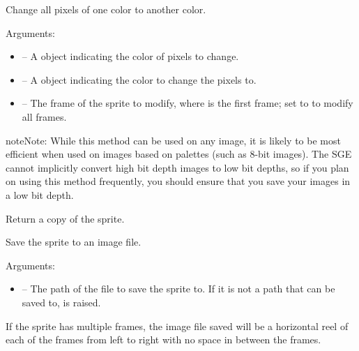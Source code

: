 \documentclass[letterpaper,10pt,english]{sphinxmanual}
\begin{document}
\begin{fulllineitems}
\label{gfx:sge.gfx.Sprite.swap_color}
Change all pixels of one color to another color.

Arguments:
\begin{itemize}
\item {} 
 -- A {\hyperref[gfx:sge.gfx.Color]{\emph{}}} object indicating
the color of pixels to change.

\item {} 
 -- A {\hyperref[gfx:sge.gfx.Color]{\emph{}}} object indicating
the color to change the pixels to.

\item {} 
 -- The frame of the sprite to modify, where  is
the first frame; set to  to modify all frames.

\end{itemize}

\begin{notice}{note}{Note:}
While this method can be used on any image, it is likely to
be most efficient when used on images based on palettes
(such as 8-bit images).  The SGE cannot implicitly convert
high bit depth images to low bit depths, so if you plan on
using this method frequently, you should ensure that you
save your images in a low bit depth.
\end{notice}

\end{fulllineitems}


\begin{fulllineitems}
\label{gfx:sge.gfx.Sprite.copy}
Return a copy of the sprite.

\end{fulllineitems}


\begin{fulllineitems}
\label{gfx:sge.gfx.Sprite.save}
Save the sprite to an image file.

Arguments:
\begin{itemize}
\item {} 
 -- The path of the file to save the sprite to.  If
it is not a path that can be saved to,  is
raised.

\end{itemize}

If the sprite has multiple frames, the image file saved will be
a horizontal reel of each of the frames from left to right with
no space in between the frames.

\end{fulllineitems}
\end{document}
